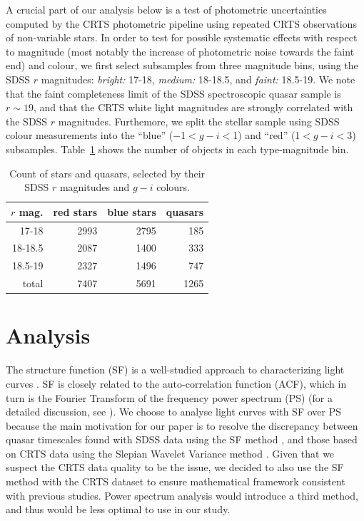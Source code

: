 \documentclass[fleqn,usenatbib]{mnras}
\begin{document}
A crucial part of our analysis below is a test of photometric uncertainties computed by the CRTS photometric
pipeline using repeated CRTS observations of non-variable stars. In order to test for possible systematic
effects with respect to magnitude (most notably the increase of photometric noise towards
the faint end) and colour, we first select  subsamples from three magnitude bins, using the SDSS $r$ magnitudes: 
{\it bright:} 17-18,  {\it medium:} 18-18.5, and {\it faint:} 18.5-19. We note that the faint completeness limit 
of the SDSS spectroscopic quasar sample is $r\sim19$, and that the CRTS white light magnitudes are strongly
correlated with the SDSS $r$ magnitudes. Furthemore, we split the stellar sample using SDSS colour measurements
into the ``blue'' ($-$1$<g-i<$1) and ``red'' (1$<g-i<$3) subsamples. Table~\ref{tab:object_count} shows the 
number of objects in each type-magnitude bin.  

\begin{table}
\centering
\caption{Count of stars and quasars, selected by their SDSS $r$ magnitudes and $g-i$ colours.}
\label{tab:object_count}
\begin{tabular}{ r|rrr } 
\hline
$r$ mag.  & red stars & blue stars & quasars \\ 
\hline
17-18   & 2993 & 2795   & 185    \\ 
18-18.5 & 2087 &  1400  & 333   \\ 
18.5-19 & 2327 &  1496  & 747   \\
\hline
total       & 7407 &  5691 & 1265 
\end{tabular}
\end{table}
 


\section{Analysis}
\label{sec:analysis}

The structure function (SF) is a well-studied approach to characterizing light curves \citep{2004Ivezic, berk2004, devries2005, macleod2010, graham2013, kozlowski2016}. SF is closely related to the auto-correlation function (ACF), which in turn is the Fourier Transform of the  frequency power spectrum (PS) (for a detailed discussion,  see \citealt{ivezic2014,kozlowski2016}). We choose to analyse light curves with SF over PS because the main motivation for our paper is to resolve the discrepancy between quasar timescales  found with SDSS data using the SF method \citep{macleod2010, macleod2011, macleod2012}, and those based on CRTS data using the Slepian Wavelet Variance method \citep{graham2014}.  Given that we suspect the CRTS data quality to be the issue, we decided to also use the SF method with the CRTS dataset to ensure mathematical framework consistent with previous studies. Power spectrum analysis would introduce a third method, and thus would be less optimal to use in our study.  
\end{document}
